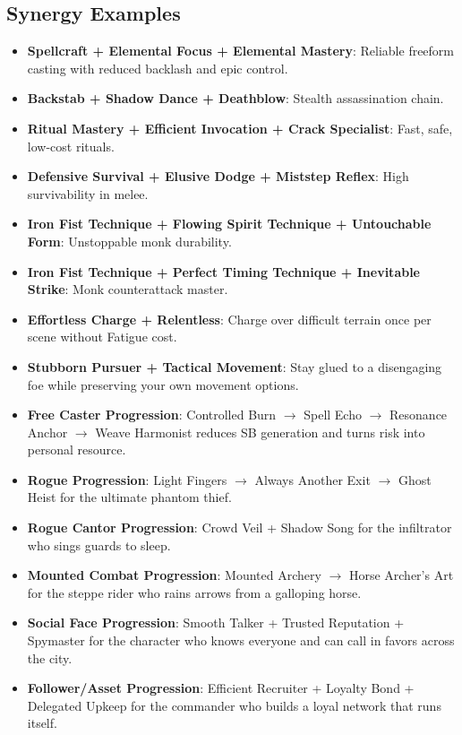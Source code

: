 \documentclass[12pt,a4paper]{book}
\begin{document}
\subsection*{Synergy Examples}
\label{sec:synergy-examples}
\begin{itemize}
  \item \textbf{Spellcraft + Elemental Focus + Elemental Mastery}: Reliable freeform casting with reduced backlash and epic control.
  \item \textbf{Backstab + Shadow Dance + Deathblow}: Stealth assassination chain.
  \item \textbf{Ritual Mastery + Efficient Invocation + Crack Specialist}: Fast, safe, low-cost rituals.
  \item \textbf{Defensive Survival + Elusive Dodge + Miststep Reflex}: High survivability in melee.
  \item \textbf{Iron Fist Technique + Flowing Spirit Technique + Untouchable Form}: Unstoppable monk durability.
  \item \textbf{Iron Fist Technique + Perfect Timing Technique + Inevitable Strike}: Monk counterattack master.
  \item \textbf{Effortless Charge + Relentless}: Charge over difficult terrain once per scene without Fatigue cost.
  \item \textbf{Stubborn Pursuer + Tactical Movement}: Stay glued to a disengaging foe while preserving your own movement options.
  \item \textbf{Free Caster Progression}: Controlled Burn $\rightarrow$ Spell Echo $\rightarrow$ Resonance Anchor $\rightarrow$ Weave Harmonist reduces SB generation and turns risk into personal resource.
  \item \textbf{Rogue Progression}: Light Fingers $\rightarrow$ Always Another Exit $\rightarrow$ Ghost Heist for the ultimate phantom thief.
  \item \textbf{Rogue Cantor Progression}: Crowd Veil + Shadow Song for the infiltrator who sings guards to sleep.
  \item \textbf{Mounted Combat Progression}: Mounted Archery $\rightarrow$ Horse Archer's Art for the steppe rider who rains arrows from a galloping horse.
  \item \textbf{Social Face Progression}: Smooth Talker + Trusted Reputation + Spymaster for the character who knows everyone and can call in favors across the city.
  \item \textbf{Follower/Asset Progression}: Efficient Recruiter + Loyalty Bond + Delegated Upkeep for the commander who builds a loyal network that runs itself.

\end{itemize}
\end{document}
